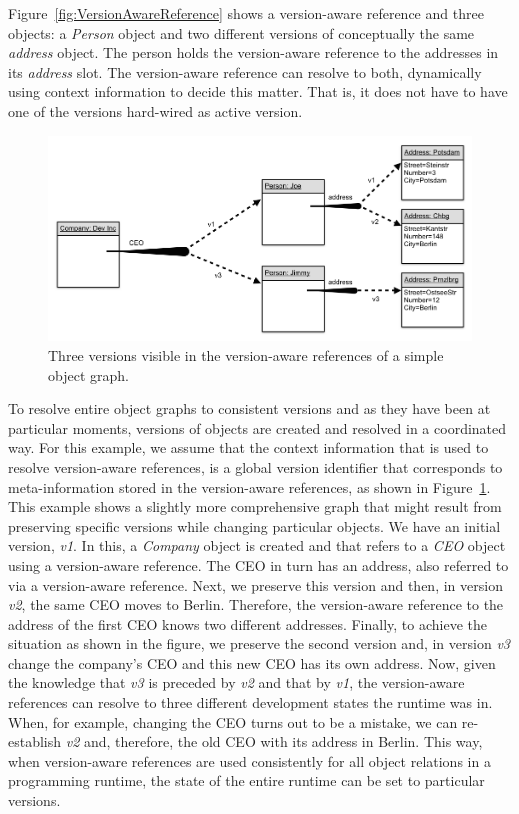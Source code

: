 Figure~\ref{fig:VersionAwareReference} shows a version-aware reference and three objects:
a \emph{Person} object and two different versions of conceptually the same \emph{address} object.
The person holds the version-aware reference to the addresses in its \emph{address} slot.
The version-aware reference can resolve to both, dynamically using context information to decide this matter.
That is, it does not have to have one of the versions hard-wired as active version.

\begin{figure}[h]
    \centering
    \includegraphics[width=\textwidth]{figures/MultipleVersionAwareReferences.png}
    \caption{Three versions visible in the version-aware references of a simple object graph.}
    \label{fig:MoreVersionAwareReferences}
\end{figure}

To resolve entire object graphs to consistent versions and as they have been at particular moments, versions of objects are created and resolved in a coordinated way.
For this example, we assume that the context information that is used to resolve version-aware references, is a global version identifier that corresponds to meta-information stored in the version-aware references, as shown in Figure~\ref{fig:MoreVersionAwareReferences}.
This example shows a slightly more comprehensive graph that might result from preserving specific versions while changing particular objects.
We have an initial version, \emph{v1}.
In this, a \emph{Company} object is created and that refers to a \emph{CEO} object using a version-aware reference.
The CEO in turn has an address, also referred to via a version-aware reference.
Next, we preserve this version and then, in version \emph{v2}, the same CEO moves to Berlin.
Therefore, the version-aware reference to the address of the first CEO knows two different addresses.
Finally, to achieve the situation as shown in the figure, we preserve the second version and, in version \emph{v3} change the company's CEO and this new CEO has its own address.
Now, given the knowledge that \emph{v3} is preceded by \emph{v2} and that by \emph{v1}, the version-aware references can resolve to three different development states the runtime was in.
When, for example, changing the CEO turns out to be a mistake, we can re-establish \emph{v2} and, therefore, the old CEO with its address in Berlin.
This way, when version-aware references are used consistently for all object relations in a programming runtime, the state of the entire runtime can be set to particular versions.

